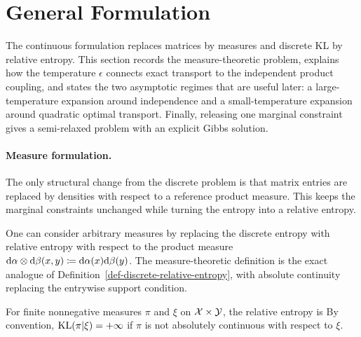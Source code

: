 \section{General Formulation}

The continuous formulation replaces matrices by measures and discrete KL by relative entropy. This section records the measure-theoretic problem, explains how the temperature $\epsilon$ connects exact transport to the independent product coupling, and states the two asymptotic regimes that are useful later: a large-temperature expansion around independence and a small-temperature expansion around quadratic optimal transport. Finally, releasing one marginal constraint gives a semi-relaxed problem with an explicit Gibbs solution.

\paragraph{Measure formulation.}

The only structural change from the discrete problem is that matrix entries are replaced by densities with respect to a reference product measure. This keeps the marginal constraints unchanged while turning the entropy into a relative entropy.

One can consider arbitrary measures by replacing the discrete entropy with relative entropy with respect to the product measure $\mathrm{d}\alpha\otimes\mathrm{d}\beta(x,y) \coloneqq \mathrm{d}\alpha(x)\mathrm{d}\beta(y)$.
The measure-theoretic definition is the exact analogue of Definition~\ref{def-discrete-relative-entropy}, with absolute continuity replacing the entrywise support condition.

\begin{defn}\label{def-measure-relative-entropy}
	For finite nonnegative measures $\pi$ and $\xi$ on $\mathcal{X}\times\mathcal{Y}$, the relative entropy is
		By convention, $\operatorname{KL}(\pi|\xi)=+\infty$ if $\pi$ is not absolutely continuous with respect to $\xi$.
\end{defn}

